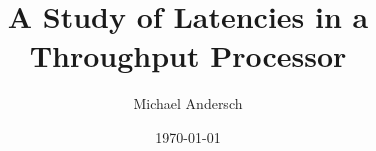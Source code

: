 \documentclass{tu-thesis}
\author{Michael Andersch}
\title{A Study of Latencies in a Throughput Processor}
\date{\today}
\begin{document}
\frontmatter
\maketitle

\abstracts



\clearpage


\mainmatter 



\printindex 

\end{document}
